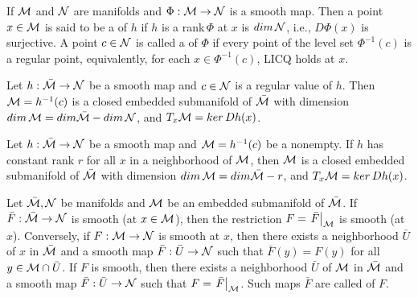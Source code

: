 \documentclass[11pt,a4paper]{article}
\begin{document}
\begin{mydef}
If $\mathcal{M}$ and $\mathcal{N}$ are manifolds and $\Phi:\mathcal{M}\rightarrow \mathcal{N}$ is a smooth map. Then a point $x\in \mathcal{M}$ is said to be a  of $h$ if $h$ is a rank$\,\Phi$ at $x$ is $dim\,\mathcal{N}$, i.e., $D\Phi(x)$ is surjective. A point $c\in \mathcal{N}$ is called a  of $\Phi$ if every point of the level set $\Phi^{-1}(c)$ is a regular point, equivalently, for each $x\in \Phi^{-1}(c)$, LICQ holds at $x$.
\end{mydef}

\begin{corollary} \label{prop:submersion_theorem}
Let $h:\bar{\mathcal{M}}\rightarrow \mathcal{N}$ be a smooth map and $c\in \mathcal{N}$ is a regular value of $h$. Then $\mathcal{M} = h^{-1}(c)$ is a closed embedded submanifold of $\bar{\mathcal{M}}$ with dimension $dim\,\mathcal{M}  = dim\bar{\mathcal{M}}-dim\,\mathcal{N}$, and $T_x\mathcal{M} = ker\,Dh(x)$.
\end{corollary}

\begin{corollary} 
Let $h:\bar{\mathcal{M}}\rightarrow \mathcal{N}$ be a smooth map and $\mathcal{M} = h^{-1}(c)$ be a nonempty. If $h$ has constant rank $r$ for all $x$ in a neighborhood of $\mathcal{M}$, then $\mathcal{M}$ is a closed embedded submanifold of $\bar{\mathcal{M}}$ with dimension $dim\,\mathcal{M}  = dim\bar{\mathcal{M}}-r$, and $T_x\mathcal{M} = ker\,Dh(x)$.
\end{corollary}


\begin{prop}
Let $\bar{\mathcal{M}}, \mathcal{N}$ be manifolds and $\mathcal{M}$ be an embedded submanifold of $\bar{\mathcal{M}}$. If $\bar{F}:\bar{\mathcal{M}}\rightarrow \mathcal{N}$ is smooth (at $x\in \mathcal{M}$), then the restriction $F = \left.\bar{F}\right|_{\mathcal{M}}$ is smooth (at $x$). Conversely, if $F:\mathcal{M}\rightarrow \mathcal{N}$ is smooth at $x$, then there exists a neighborhood $\bar{U}$ of $x$ in $\bar{\mathcal{M}}$ and a smooth map $\bar{F}:\bar{U}\rightarrow \mathcal{N}$ such that $\bar{F}(y) = F(y)$ for all $y\in \mathcal{M}\cap \bar{U}$. If $F$ is smooth, then there exists a neighborhood $\bar{U}$ of $\mathcal{M}$ in $\bar{\mathcal{M}}$ and a smooth map $\bar{F}:\bar{U}\rightarrow \mathcal{N}$ such that $F = \left.\bar{F}\right|_{\mathcal{M}}$. Such maps $\bar{F}$ are called  of $F$.
\end{prop}
\end{document}
